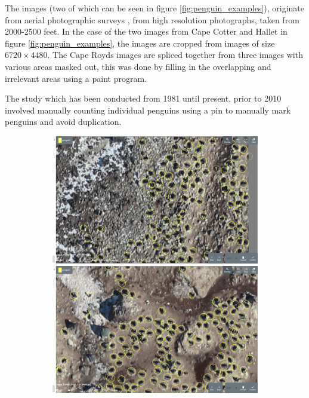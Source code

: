 The images (two of which can be seen in figure \ref{fig:penguin_examples}), originate from aerial photographic surveys \cite{Lyver2014}, from high resolution photographs, taken from 2000-2500 feet. In the case of the two images from Cape Cotter and Hallet in figure \ref{fig:penguin_examples}, the images are cropped from images of size $ 6720\times4480 $. The Cape Royds images are spliced together from three images with various areas masked out, this was done by filling in the overlapping and irrelevant areas using a paint program.

The study which has been conducted from 1981 until present, prior to 2010 involved manually counting individual penguins using a pin to manually mark penguins and avoid duplication. 

\begin{figure}[h!]
\centering
\begin{subfigure}[t]{1.0\linewidth}
  \includegraphics[width=0.475\linewidth]{figures/annotation/screenshots/penguins_aerial.png}
  \hfill
  \includegraphics[width=0.475\linewidth]{figures/annotation/screenshots/penguins_aerial2.png}
  \caption{}
\end{subfigure}

\caption{ }
\label {fig:penguin_aerial_examples}
\end{figure}



